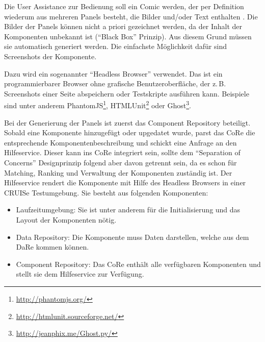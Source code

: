 \documentclass[
	headsepline,
	footsepline,
	fontsize=12pt,
	bibliography=totoc
]{scrbook}
\begin{document}


Die User Assistance zur Bedienung soll ein Comic werden, der per Definition wiederum aus mehreren Panels besteht, die Bilder und/oder Text enthalten \cite{McCloud1994}. Die Bilder der Panels können nicht a priori gezeichnet werden, da der Inhalt der Komponenten unbekannt ist (\enquote{Black Box} Prinzip). Aus diesem Grund müssen sie automatisch generiert werden. Die einfachste Möglichkeit dafür sind Screenshots der Komponente.


Dazu wird ein sogenannter \enquote{Headless Browser} verwendet. Das ist ein programmierbarer Browser ohne grafische Benutzeroberfläche, der z.\,B. Screenshots einer Seite abspeichern oder Testskripte ausführen kann. Beispiele sind unter anderem PhantomJS\footnote{\url{http://phantomjs.org/}}, HTMLUnit\footnote{\url{http://htmlunit.sourceforge.net/}} oder Ghost\footnote{\url{http://jeanphix.me/Ghost.py/}}.


Bei der Generierung der Panels ist zuerst das Component Repository beteiligt. Sobald eine Komponente hinzugefügt oder upgedatet wurde, parst das CoRe die entsprechende Komponentenbeschreibung und schickt eine Anfrage an den Hilfeservice. Dieser kann ins CoRe integriert sein, sollte dem \enquote{Separation of Concerns} Designprinzip folgend aber davon getrennt sein, da es schon für Matching, Ranking und Verwaltung der Komponenten zuständig ist. Der Hilfeservice rendert die Komponente mit Hilfe des Headless Browsers in einer CRUISe Testumgebung. Sie besteht aus folgenden Komponenten:

\begin{itemize}
	\item Laufzeitumgebung: Sie ist unter anderem für die Initialisierung und das Layout der Komponenten nötig.
	\item Data Repository: Die Komponente muss Daten darstellen, welche aus dem DaRe kommen können.
	\item Component Repository: Das CoRe enthält alle verfügbaren Komponenten und stellt sie dem Hilfeservice zur Verfügung.
\end{itemize}
\end{document}
